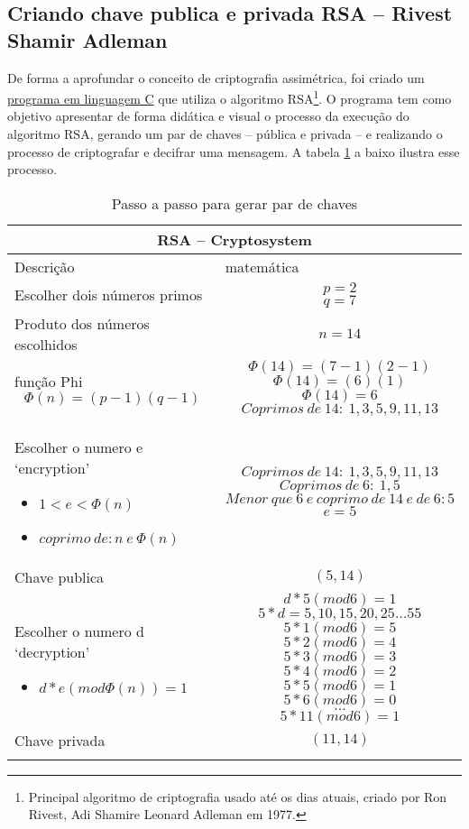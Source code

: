 \subsection{Criando chave publica e privada RSA – Rivest Shamir Adleman}

De forma a aprofundar o conceito de criptografia assimétrica, foi criado um \href{https://github.com/gzsig/ic/tree/master/criptografia}{programa em linguagem C} que utiliza o algoritmo RSA\footnote{ Principal algoritmo de criptografia usado até os dias atuais, criado por Ron Rivest, Adi Shamire Leonard Adleman em 1977.}. O programa tem como objetivo apresentar de forma didática e visual o processo da execução do algoritmo RSA, gerando um par de chaves – pública e privada – e realizando o processo de criptografar e decifrar uma mensagem. A tabela \ref{criptography_step_by_step} a baixo ilustra esse processo.

\vspace{1cm}
\begin{longtable}{ |p{6cm}|| p{8cm}|  }
  \hline
  \multicolumn{2}{|c|}{RSA – Cryptosystem} \\
  \hline
    Descrição & matemática\\
  \hline
    Escolher dois números primos & 
    \[p=2\] \[q=7\]\\
  \hline
    Produto dos números escolhidos & 
    \[n=14\]\\
  \hline
    função Phi 
    \[\Phi(n)=(p-1)(q-1)\] & 
    \[\Phi(14)=(7-1)(2-1)\]
    \[\Phi(14)=(6)(1)\]
    \[\Phi(14)=6\]
    \[Coprimos\: de\: 14:\: 1, 3, 5, 9, 11, 13\]\\
  \hline
    Escolher o numero e `encryption'
    \begin{itemize}
      \item $1 < e < \Phi(n)$
      \item $coprimo\: de: n\: e\: \Phi(n)$
    \end{itemize} &
    \[Coprimos\: de\: 14:\: 1, 3, 5, 9, 11, 13\]
    \[Coprimos\: de\: 6:\: 1, 5\]
    \[Menor\: que\: 6\: e\: coprimo\: de\: 14\: e\: de\: 6: 5\]
    \[e = 5\]\\
  \hline
    Chave publica & 
    \[(5, 14)\]\\
  \hline
  Escolher o numero d `decryption'
    \begin{itemize}
      \item $d * e (mod \Phi(n)) = 1$
    \end{itemize} & 
    \[d * 5 (mod 6) = 1\]
    \[5*d = 5, 10, 15, 20, 25 \dots 55\]
    \[5*1 (mod 6) = 5\]
    \[5*2 (mod 6) = 4\]
    \[5*3 (mod 6) = 3\]
    \[5*4 (mod 6) = 2\]
    \[5*5 (mod 6) = 1\]
    \[5*6 (mod 6) = 0\]
    \[ \dots \]
    \[5*11 (mod 6) = 1\] \\
  \hline
  Chave privada & 
  \[(11, 14)\]\\
  \hline
  \caption{Passo a passo para gerar par de chaves}
  \label{criptography_step_by_step}
\end{longtable}

